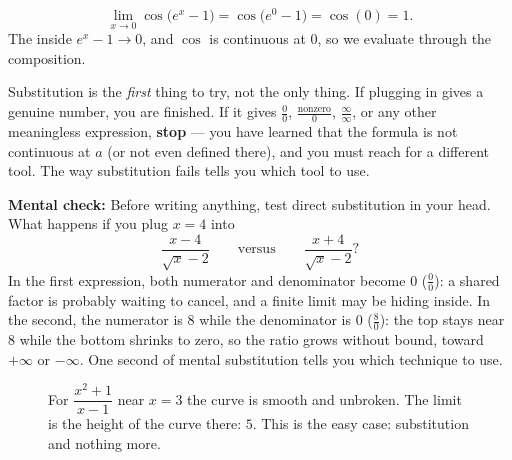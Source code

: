 \begin{example}
\label{ch07:ex-subst2}
\[
  \lim_{x\to 0} \cos\!\big(e^{x} - 1\big)
  = \cos\!\big(e^{0} - 1\big)
  = \cos(0) = 1.
\]
The inside $e^{x}-1 \to 0$, and $\cos$ is continuous at $0$, so we evaluate
through the composition.
\end{example}

\begin{trapbox}
Substitution is the \emph{first} thing to try, not the only thing. If plugging
in gives a genuine number, you are finished. If it gives $\frac{0}{0}$,
$\frac{\text{nonzero}}{0}$, $\frac{\infty}{\infty}$, or any other
meaningless expression, \textbf{stop} --- you have learned that the formula is not
continuous at $a$ (or not even defined there), and you must reach for a
different tool. The way substitution fails tells you which tool to use.
\end{trapbox}

\begin{recoverybox}
\textbf{Mental check:} Before writing anything, test direct
substitution in your head. What happens if you plug $x=4$ into
\[
  \frac{x-4}{\sqrt{x}-2} \qquad\text{versus}\qquad \frac{x+4}{\sqrt{x}-2}?
\]
In the first expression, both numerator and denominator become $0$ ($\frac00$):
a shared factor is probably waiting to cancel, and a finite limit may be hiding inside.
In the second, the numerator is $8$ while the denominator is $0$ ($\frac80$): the
top stays near $8$ while the bottom shrinks to zero, so the ratio grows
without bound, toward $+\infty$ or $-\infty$. One second of mental substitution
tells you which technique to use.
\end{recoverybox}

\begin{figure}[htbp]
\centering
{}
\caption{For $\dfrac{x^{2}+1}{x-1}$ near $x=3$ the curve is smooth and
unbroken. The limit is the height of the curve there: $5$. This is the
easy case: substitution and nothing more.}
\label{ch07:fig-subst}
\end{figure}

